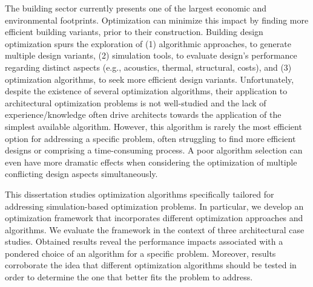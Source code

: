 \noindent 

The building sector currently presents one of the largest economic and environmental footprints. Optimization can minimize this impact by finding more efficient building variants, prior to their construction. Building design optimization spurs the exploration of (1) algorithmic approaches, to generate multiple design variants, (2) simulation tools, to evaluate design's performance regarding distinct aspects (e.g., acoustics, thermal, structural, costs), and (3) optimization algorithms, to seek more efficient design variants. Unfortunately, despite the existence of several optimization algorithms, their application to architectural optimization problems is not well-studied and the lack of experience/knowledge often drive architects towards the application of the simplest available algorithm. However, this algorithm is rarely the most efficient option for addressing a specific problem, often struggling to find more efficient designs or comprising a time-consuming process. A poor algorithm selection can even have more dramatic effects when considering the optimization of multiple conflicting design aspects simultaneously. 

This dissertation studies optimization algorithms specifically tailored for addressing simulation-based optimization problems. In particular, we develop an optimization framework that incorporates different optimization approaches and algorithms. We evaluate the framework in the context of three architectural case studies. Obtained results reveal the performance impacts associated with a pondered choice of an algorithm for a specific problem. Moreover, results corroborate the idea that different optimization algorithms should be tested in order to determine the one that better fits the problem to address. 
